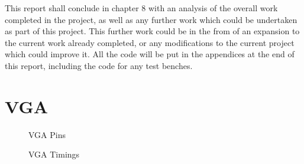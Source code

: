 \documentclass[a4paper,12pt]{article}
\begin{document}
\begin{flushleft}
This report shall conclude in chapter 8 with an analysis of the overall work completed in the project, as well as any further work which could be undertaken as part of this project. This further work could be in the from of an expansion to the current work already completed, or any modifications to the current project which could improve it.  All the code will be put in the appendices at the end of this report, including the code for any test benches. 
\end{flushleft}
\newpage
\section{VGA}
\begin{flushleft}
\begin{figure}[H]
	\centering
	\caption{VGA Pins \cite{terasic_2014}}
\end{figure}
\begin{figure}[H]
	\centering
	\caption{VGA Timings \cite{terasic_2014}}
\end{figure}
\end{flushleft}
\newpage
\end{document}
